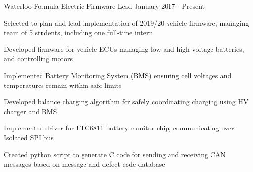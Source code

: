 

\begin{cventries}
  \cventrytwo
    {Waterloo Formula Electric} %
    {Firmware Lead} %
    {} %
    {January 2017 - Present} %
    {
      \begin{cvitems}
        \item {Selected to plan and lead implementation of 2019/20 vehicle firmware, managing team of 5 students, including one full-time intern}
        \item {Developed firmware for vehicle ECUs managing low and high voltage batteries, and controlling motors}
        \item {Implemented Battery Monitoring System (BMS) ensuring cell voltages and temperatures remain within safe limits}
        \item {Developed balance charging algorithm for safely coordinating charging using HV charger and BMS}
        \item {Implemented driver for LTC6811 battery monitor chip, communicating over Isolated SPI bus}
        \item {Created python script to generate C code for sending and receiving CAN messages based on message and defect code database}
      \end{cvitems}
    }


\end{cventries}
